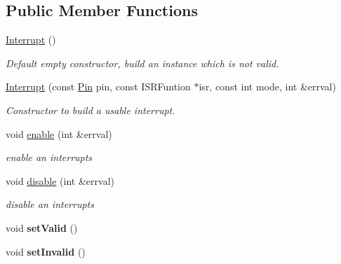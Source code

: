 \subsection*{Public Member Functions}
\begin{DoxyCompactItemize}
\item 
\hyperlink{classliberamox_1_1Interrupt_a7b665432d926e17063409c32e48d985f}{Interrupt} ()\hypertarget{classliberamox_1_1Interrupt_a7b665432d926e17063409c32e48d985f}{}\label{classliberamox_1_1Interrupt_a7b665432d926e17063409c32e48d985f}

\begin{DoxyCompactList}\small\item\em Default empty constructor, build an instance which is not valid. \end{DoxyCompactList}\item 
\hyperlink{classliberamox_1_1Interrupt_a0479839f342e75ebe1bd379f9d54741e}{Interrupt} (const \hyperlink{classliberamox_1_1Pin}{Pin} pin, const I\+S\+R\+Funtion $\ast$isr, const int mode, int \&errval)
\begin{DoxyCompactList}\small\item\em Constructor to build a usable interrupt. \end{DoxyCompactList}\item 
void \hyperlink{classliberamox_1_1Interrupt_ab8148e27ca9a50e98b291b2909a2df08}{enable} (int \&errval)
\begin{DoxyCompactList}\small\item\em enable an interrupts \end{DoxyCompactList}\item 
void \hyperlink{classliberamox_1_1Interrupt_a2b533ca115c7488e69ef2b041dfbcd95}{disable} (int \&errval)
\begin{DoxyCompactList}\small\item\em disable an interrupts \end{DoxyCompactList}\item 
void {\bfseries set\+Valid} ()\hypertarget{classliberamox_1_1Interrupt_a2030477440fd97e9c8bf39014e359cca}{}\label{classliberamox_1_1Interrupt_a2030477440fd97e9c8bf39014e359cca}

\item 
void {\bfseries set\+Invalid} ()\hypertarget{classliberamox_1_1Interrupt_a021a8f5bc2257558b294eb1b0e41cdc4}{}\label{classliberamox_1_1Interrupt_a021a8f5bc2257558b294eb1b0e41cdc4}

\end{DoxyCompactItemize}
